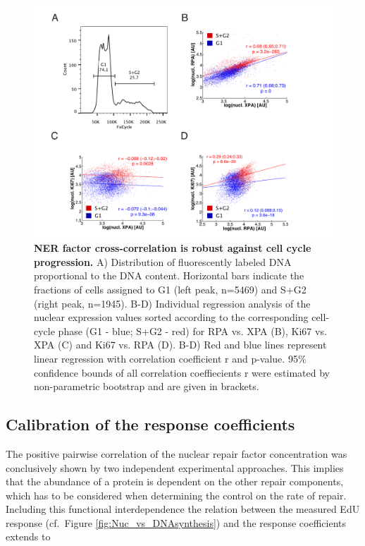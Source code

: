 \begin{figure}[htbp]
	\begin{center}
		\includegraphics[width=1\textwidth]{Abbildungen/figureTAC_4.pdf}
		\caption{\textbf{NER factor cross-correlation is robust against cell cycle progression.} A) Distribution of fluorescently labeled DNA proportional to the DNA content. Horizontal bars indicate the fractions of cells assigned to G1 (left peak, n=5469) and S+G2 (right peak, n=1945).  B-D) Individual regression analysis of the nuclear expression values sorted according to the corresponding cell-cycle phase (G1 - blue; S+G2 - red) for RPA vs. XPA (B), Ki67 vs. XPA (C) and Ki67 vs. RPA (D). B-D) Red and blue lines represent linear regression with correlation coefficient r and p-value. 95\% confidence bounds of all correlation coeffiecients r were estimated by non-parametric bootstrap and are given in brackets.}
		\label{fig:FC_cell_cycle}
	\end{center}
\end{figure}





\newpage

\subsection{Calibration of the response coefficients}
The positive pairwise correlation of the nuclear repair factor concentration was conclusively shown by two independent experimental approaches. This implies that the abundance of a protein is dependent on the other repair components, which has to be considered when determining the control on the rate of repair. Including this functional interdependence the relation between the measured EdU response (cf.\ Figure \ref{fig:Nuc_vs_DNAsynthesis}) and the response coefficients extends to 

